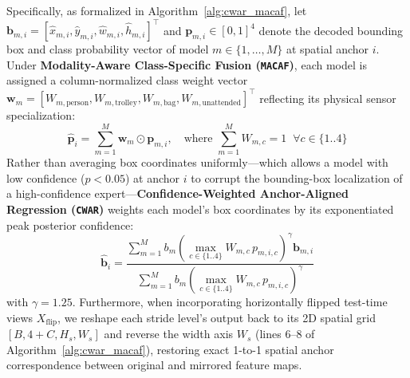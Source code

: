 \documentclass[journal,twoside,web]{ieeecolor}
\begin{document}
Specifically, as formalized in Algorithm~\ref{alg:cwar_macaf}, let $\mathbf{b}_{m,i} = [\hat{x}_{m,i}, \hat{y}_{m,i}, \hat{w}_{m,i}, \hat{h}_{m,i}]^\top$ and $\mathbf{p}_{m,i} \in [0,1]^4$ denote the decoded bounding box and class probability vector of model $m \in \{1,\dots,M\}$ at spatial anchor $i$. Under \textbf{Modality-Aware Class-Specific Fusion (\texttt{MACAF})}, each model is assigned a column-normalized class weight vector $\mathbf{w}_m = [W_{m,\text{person}}, W_{m,\text{trolley}}, W_{m,\text{bag}}, W_{m,\text{unattended}}]^\top$ reflecting its physical sensor specialization:
\begin{equation}
\hat{\mathbf{p}}_i = \sum_{m=1}^M \mathbf{w}_m \odot \mathbf{p}_{m,i}, \quad \text{where } \sum_{m=1}^M W_{m,c} = 1 \;\;\forall c \in \{1..4\}
\label{eq:macaf_probs}
\end{equation}
Rather than averaging box coordinates uniformly---which allows a model with low confidence ($p < 0.05$) at anchor $i$ to corrupt the bounding-box localization of a high-confidence expert---\textbf{Confidence-Weighted Anchor-Aligned Regression (\texttt{CWAR})} weights each model's box coordinates by its exponentiated peak posterior confidence:
\begin{equation}
\hat{\mathbf{b}}_i = \frac{\sum_{m=1}^M b_m \left(\max_{c \in \{1..4\}} W_{m,c}\, p_{m,i,c}\right)^\gamma \mathbf{b}_{m,i}}{\sum_{m=1}^M b_m \left(\max_{c \in \{1..4\}} W_{m,c}\, p_{m,i,c}\right)^\gamma}
\label{eq:cwar_boxes}
\end{equation}
with $\gamma = 1.25$. Furthermore, when incorporating horizontally flipped test-time views $X_{\text{flip}}$, we reshape each stride level's output back to its 2D spatial grid $[B, 4+C, H_s, W_s]$ and reverse the width axis $W_s$ (lines 6--8 of Algorithm~\ref{alg:cwar_macaf}), restoring exact 1-to-1 spatial anchor correspondence between original and mirrored feature maps.
\end{document}
